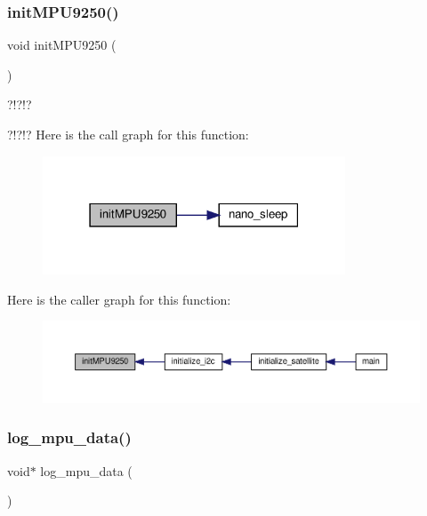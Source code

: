 \subsubsection{\texorpdfstring{init\+M\+P\+U9250()}{initMPU9250()}}
{\footnotesize\ttfamily void init\+M\+P\+U9250 (\begin{DoxyParamCaption}{ }\end{DoxyParamCaption})}

?!?!?

?!?!? Here is the call graph for this function\+:
\nopagebreak
\begin{figure}[H]
\begin{center}
\leavevmode
\includegraphics[width=255pt]{i2c-interface_8c_a24e95677ec9c52347c6e2bda7708c319_cgraph}
\end{center}
\end{figure}
Here is the caller graph for this function\+:
\nopagebreak
\begin{figure}[H]
\begin{center}
\leavevmode
\includegraphics[width=350pt]{i2c-interface_8c_a24e95677ec9c52347c6e2bda7708c319_icgraph}
\end{center}
\end{figure}
\mbox{\label{i2c-interface_8c_a0ffd56a84248b3976097e0d38b2fcdaf}} 
\subsubsection{\texorpdfstring{log\+\_\+mpu\+\_\+data()}{log\_mpu\_data()}}
{\footnotesize\ttfamily void$\ast$ log\+\_\+mpu\+\_\+data (\begin{DoxyParamCaption}{ }\end{DoxyParamCaption})}

